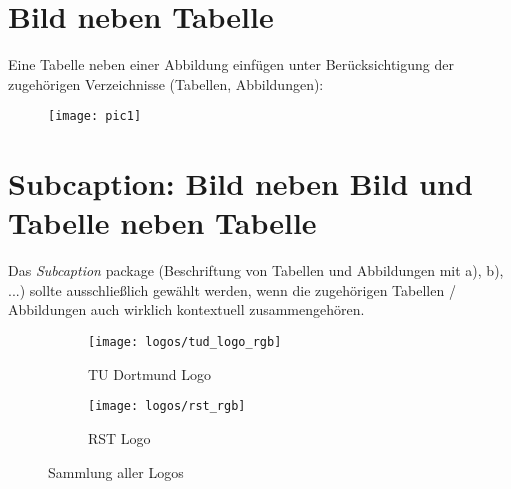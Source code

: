 \section{Bild neben Tabelle}
Eine Tabelle neben einer Abbildung einfügen unter Berücksichtigung der zugehörigen Verzeichnisse (Tabellen, Abbildungen):
\begin{figure}[htbp]
%
	\begin{minipage}[t]{0.45\textwidth}
	\centering
	\label{tab:bsp2}
	\end{minipage}
%
	\begin{minipage}[t]{0.45\textwidth}
	\centering
	  \texttt{[image: pic1]}
	\end{minipage}
\end{figure}


\section{Subcaption: Bild neben Bild und Tabelle neben Tabelle}

Das \textit{Subcaption} package (Beschriftung von Tabellen und Abbildungen mit a), b), ...) sollte ausschließlich gewählt werden,
wenn die zugehörigen Tabellen / Abbildungen auch wirklich kontextuell zusammengehören.

\begin{figure}[htbp]
        \centering
        \begin{subfigure}[b]{0.3\textwidth}
        		\centering
                \texttt{[image: logos/tud\_logo\_rgb]} 
                \caption{TU Dortmund Logo}
                \label{fig:subfigure_tud_logo}
        \end{subfigure}%
        \quad %
        \begin{subfigure}[b]{0.3\textwidth}
        		\centering
                \texttt{[image: logos/rst\_rgb]} %
                \caption{RST Logo}
                \label{fig:subfigure_rst_rgb}
        \end{subfigure}
        \caption{Sammlung aller Logos}
        \label{fig:logos}
\end{figure}

